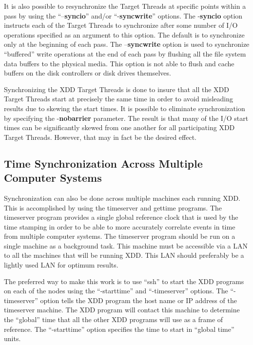 It is also possible to resynchronize the Target Threads at specific points within a pass by using the ``--\textbf{syncio}'' and/or ``-\textbf{syncwrite}'' options. The -\textbf{syncio} option instructs each of the Target Threads to synchronize after some number of I/O operations specified as an argument to this option. The default is to synchronize only at the beginning of each pass. The --\textbf{syncwrite} option is used to synchronize ``buffered'' write operations at the end of each pass by flushing all the file system data buffers to the physical media. This option is not able to flush and cache buffers on the disk controllers or disk drives themselves.

Synchronizing the XDD Target Threads is done to insure that all the XDD Target Threads start at precisely the same time in order to avoid misleading results due to skewing the start times. It is possible to eliminate synchronization by specifying the -\textbf{nobarrier} parameter. The result is that many of the I/O start times can be significantly skewed from one another for all participating XDD Target Threads. However, that may in fact be the desired effect.

\subsection{Time Synchronization Across Multiple Computer Systems}\label{time-synchronization-across-multiple-computer-systems}

Synchronization can also be done across multiple machines each running XDD. This is accomplished by using the timeserver and gettime programs. The timeserver program provides a single global reference clock that is used by the time stamping in order to be able to more accurately correlate events in time from multiple computer systems. The timeserver program should be run on a single machine as a background task. This machine must be accessible via a LAN to all the machines that will be running XDD. This LAN should preferably be a lightly used LAN for optimum results.

The preferred way to make this work is to use ``ssh'' to start the XDD programs on each of the nodes using the ``-starttime'' and ``-timeserver'' options. The ``-timeserver'' option tells the XDD program the host name or IP address of the timeserver machine. The XDD program will contact this machine to determine the ``global'' time that all the other XDD programs will use as a frame of reference. The ``-starttime'' option specifies the time to start in ``global time'' units.

